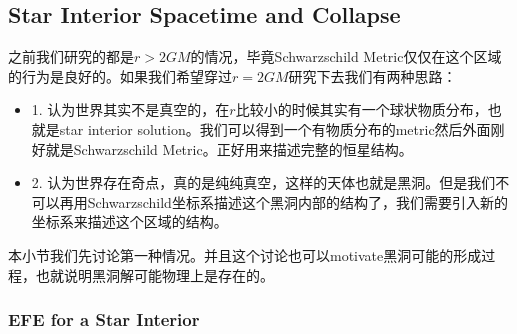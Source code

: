 \subsection{Star Interior Spacetime and Collapse}

之前我们研究的都是$ r > 2GM $的情况，毕竟Schwarzschild
Metric仅仅在这个区域的行为是良好的。如果我们希望穿过$ r = 2GM $研究下去我们有两种思路：
\begin{itemize}
  \item 1. 认为世界其实不是真空的，在$ r $比较小的时候其实有一个球状物质分布，也就是star interior
    solution。我们可以得到一个有物质分布的metric然后外面刚好就是Schwarzschild Metric。正好用来描述完整的恒星结构。
  \item 2.
    认为世界存在奇点，真的是纯纯真空，这样的天体也就是黑洞。但是我们不可以再用Schwarzschild坐标系描述这个黑洞内部的结构了，我们需要引入新的坐标系来描述这个区域的结构。
\end{itemize}
本小节我们先讨论第一种情况。并且这个讨论也可以motivate黑洞可能的形成过程，也就说明黑洞解可能物理上是存在的。

\subsubsection{EFE for a Star Interior}

\bigskip
{}

